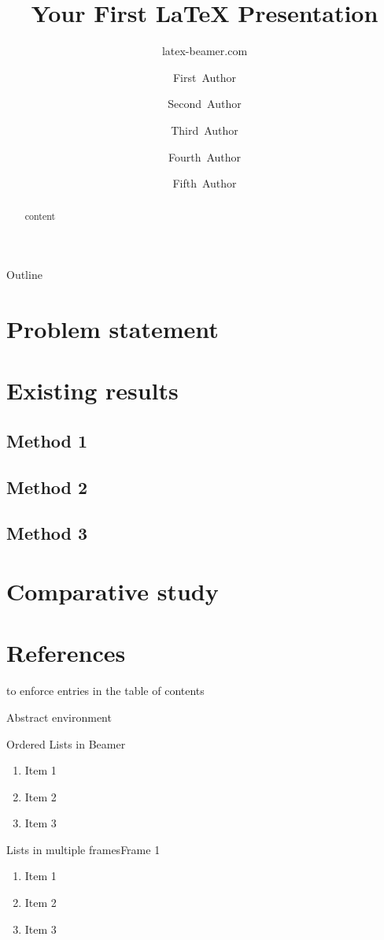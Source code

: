 \documentclass{beamer}
\title{Your First \LaTeX{} Presentation}
\author{latex-beamer.com}
\institute{Online Beamer Tutorials}
\author{First~Author \and 
  Second~Author \and
  Third~Author \and
  Fourth~Author \and
   Fifth~Author}
\begin{document}
\begin{frame}
    \titlepage
\end{frame}

\begin{frame}{Outline}
  \tableofcontents
 \end{frame}

\section{Problem statement}
 \section{Existing results}
   \subsection{Method 1}
   \subsection{Method 2}
   \subsection{Method 3}
\section{Comparative study}
 \section*{References}

 \begin{frame}
 to enforce entries in the table of contents
\end{frame}

 Abstract environment
\begin{abstract}
  content
\end{abstract}

 \begin{frame}{Ordered Lists in Beamer}
\begin{enumerate}
    \item Item 1
    \item Item 2
    \item Item 3
\end{enumerate}
 \end{frame}

\begin{frame}{Lists in multiple frames}{Frame 1}
\begin{enumerate}
    \item Item 1
    \item Item 2
   \item Item 3
   \setcounter{currentenumi}{\theenumi}
\end{enumerate}
 \end{frame}
\end{document}
